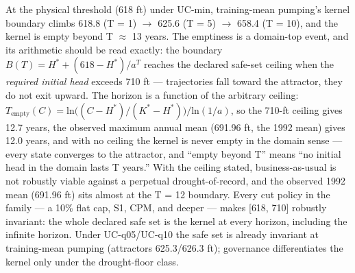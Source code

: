 \documentclass[11pt]{article}
\begin{document}
At the physical threshold (618 ft) under UC-min, training-mean pumping's
kernel boundary climbs 618.8 (T = 1) \ensuremath{\rightarrow} 625.6 (T = 5) \ensuremath{\rightarrow} 658.4 (T = 10),
and the kernel is empty beyond T \ensuremath{\approx} 13 years. The emptiness is a
domain-top event, and its arithmetic should be read exactly: the
boundary \(B(T) = H^{\ast} + (618 - H^{\ast})/a^{T}\) reaches the
declared safe-set ceiling when the \emph{required initial head} exceeds
710 ft --- trajectories fall toward the attractor, they do not exit
upward. The horizon is a function of the arbitrary ceiling:
\(T_{\mathrm{empty}}(C) = \mathrm{ln}\bigl((C - H^{\ast})/(K^{\ast} - H^{\ast})\bigr)/\mathrm{ln}(1/a)\),
so the 710-ft ceiling gives 12.7 years, the observed maximum annual mean
(691.96 ft, the 1992 mean) gives 12.0 years, and with no ceiling the
kernel is never empty in the domain sense --- every state converges to
the attractor, and ``empty beyond T'' means ``no initial head in the
domain lasts T years.'' With the ceiling stated, business-as-usual is
not robustly viable against a perpetual drought-of-record, and the
observed 1992 mean (691.96 ft) sits almost at the T = 12 boundary. Every
cut policy in the family --- a 10\% flat cap, S1, CPM, and deeper ---
makes {[}618, 710{]} robustly invariant: the whole declared safe set is
the kernel at every horizon, including the infinite horizon. Under
UC-q05/UC-q10 the safe set is already invariant at training-mean pumping
(attractors 625.3/626.3 ft); governance differentiates the kernel only
under the drought-floor class.
\end{document}
